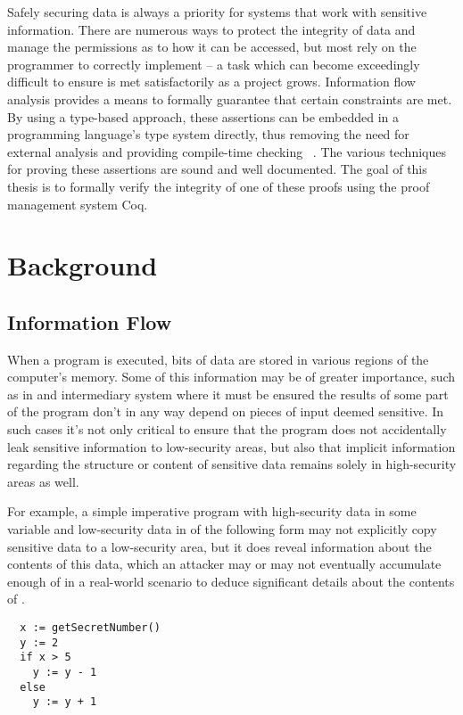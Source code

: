\documentclass[12pt]{report}
\begin{document}
Safely securing data is always a priority for systems that work with
sensitive information. There are numerous ways to protect the
integrity of data and manage the permissions as to how it can be
accessed, but most rely on the programmer to correctly implement
– a task which can become exceedingly difficult to ensure is met
satisfactorily as a project grows. Information flow analysis provides
a means to formally guarantee that certain constraints are met. By
using a type-based approach, these assertions can be embedded in
a programming language's type system directly, thus removing the need
for external analysis and providing compile-time checking
~\cite{DBLP:conf/esorics/BanatreBM94}. The various techniques for
proving these assertions are sound and well documented. The goal of
this thesis is to formally verify the integrity of one of these
proofs using the proof management system Coq. 

\section{Background}



\subsection{Information Flow}



When a program is executed, bits of data are stored in various
regions of the computer's memory. Some of this information may be of
greater importance, such as in and intermediary system where it must
be ensured the results of some part of the program don't in any way
depend on pieces of input deemed sensitive. In such cases it's not
only critical to ensure that the program does not accidentally leak
sensitive information to low-security areas, but also that implicit
information regarding the structure or content of sensitive data
remains solely in high-security areas as well.


For example, a simple imperative program with high-security data in
some variable  and low-security data in  of
the following form may not explicitly copy sensitive data to
a low-security area, but it does reveal information about the
contents of this data, which an attacker may or may not eventually
accumulate enough of in a real-world scenario to deduce significant
details about the contents of .


\begin{verbatim}
  x := getSecretNumber()
  y := 2
  if x > 5
    y := y - 1
  else
    y := y + 1
\end{verbatim}
\end{document}

